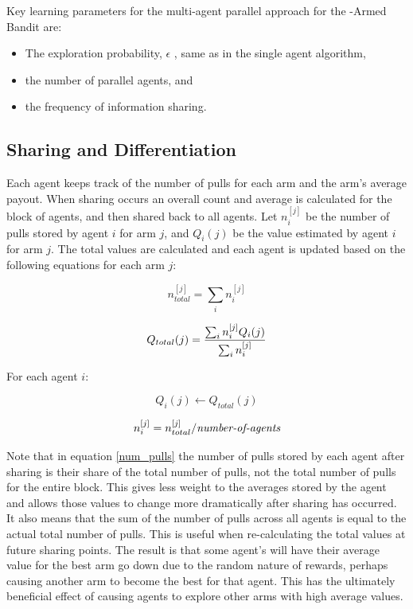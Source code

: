 \documentclass[11pt]{article} %
\begin{document}
\begin{flushleft}

Key learning parameters for the multi-agent parallel approach for the  -Armed Bandit are:

\begin{itemize}
\item
The exploration probability, $\epsilon$ , same as in the single agent algorithm,
\item
the number of parallel agents, and
\item
the frequency of information sharing.
\end{itemize}

\subsection{Sharing and Differentiation}
Each agent keeps track of the number of pulls for each arm and the arm’s average payout.  When sharing occurs an overall count and average is calculated for the block of agents, and then shared back to all agents.  Let $n_i^{[j]}$ be the number of pulls stored by agent $i$ for arm $j$, and $Q_i(j)$ be the value estimated by agent $i$ for arm $j$.  The total values are calculated and each agent is updated based on the following equations for each arm $j$:

\begin{equation}
n_{total}^{[j]}=\sum_in_i^{[j]}
\end{equation}

\begin{equation}
Q_{total}(j)={ {\sum_in_i^{[j]}Q_i(j)} \over {\sum_in_i^{[j]}}}
\end{equation}

For each agent $i$:

\begin{equation}
Q_i(j) \gets Q_{total}(j)
\end{equation}

\begin{equation}
n_i^{[j]} = n_{total}^{[j]}/\mbox{\it number-of-agents} \label{num_pulls}
\end{equation}

Note that in equation \eqref{num_pulls} the number of pulls stored by each agent after sharing is their share of the total number of pulls, not the total number of pulls for the entire block.  This gives less weight to the averages stored by the agent and allows those values to change more dramatically after sharing has occurred.  It also means that the sum of the number of pulls across all agents is equal to the actual total number of pulls.  This is useful when re-calculating the total values at future sharing points.  The result is that some agent's will have their average value for the best arm go down due to the random nature of rewards, perhaps causing another arm to become the best for that agent.  This has the ultimately beneficial effect of causing agents to explore other arms with high average values.


\end{flushleft}
\end{document}
